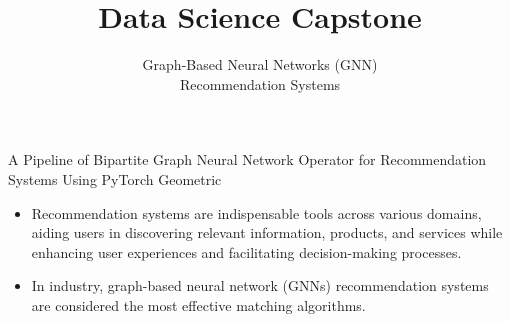 \documentclass{beamer}
\date[] %
\begin{document}
\lstset{language=Python}

\title{Data Science Capstone}
\subtitle{Graph-Based Neural Networks (GNN) \\  Recommendation Systems}
\date{}

\frame{\titlepage}


\begin{frame}
\frametitle{}
\huge \center A Pipeline of Bipartite Graph Neural Network Operator for Recommendation Systems Using PyTorch Geometric
\end{frame}


\begin{frame}[fragile]
\begin{itemize}
\frametitle{Motivation}
[ball]

\item Recommendation systems are indispensable tools across various domains, aiding users in discovering relevant information, products, and services while enhancing user experiences and facilitating decision-making processes.

\vspace{0.3cm}

\item In industry, graph-based neural network 
(GNNs) recommendation systems are considered the most effective matching algorithms. 

\vspace{0.5cm}

\begin{minipage}[c]{0.8\textwidth}
    
\end{minipage}

\end{itemize}
\end{frame}


\end{document}
